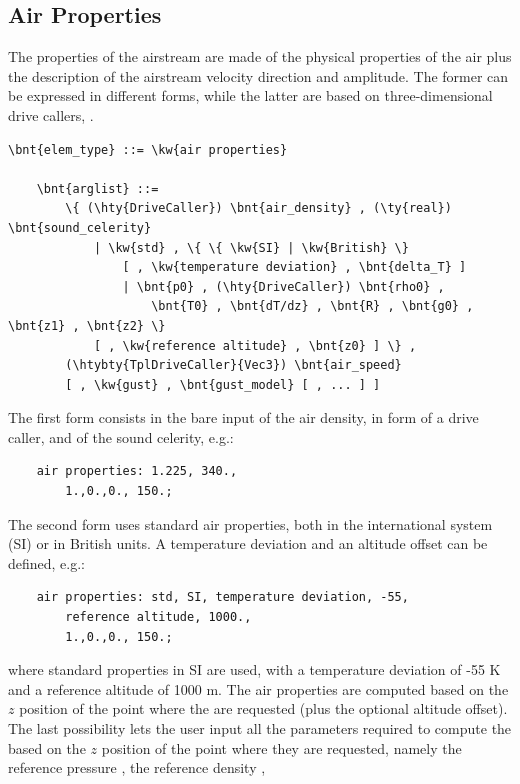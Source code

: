 \subsection{Air Properties}\label{sec:EL:AERO:AIRPROPERTIES}
The properties of the airstream are made of the physical properties
of the air plus the description of the airstream velocity direction
and amplitude.
The former can be expressed in different forms, while the latter
are based on three-dimensional drive callers, .
\begin{Verbatim}[commandchars=\\\{\}]
    \bnt{elem_type} ::= \kw{air properties}

    \bnt{arglist} ::=
        \{ (\hty{DriveCaller}) \bnt{air_density} , (\ty{real}) \bnt{sound_celerity}
            | \kw{std} , \{ \{ \kw{SI} | \kw{British} \}
                [ , \kw{temperature deviation} , \bnt{delta_T} ]
                | \bnt{p0} , (\hty{DriveCaller}) \bnt{rho0} ,
                    \bnt{T0} , \bnt{dT/dz} , \bnt{R} , \bnt{g0} , \bnt{z1} , \bnt{z2} \}
            [ , \kw{reference altitude} , \bnt{z0} ] \} ,
        (\htybty{TplDriveCaller}{Vec3}) \bnt{air_speed}
        [ , \kw{gust} , \bnt{gust_model} [ , ... ] ]
\end{Verbatim}
The first form consists in the bare input of the air density,
in form of a drive caller, and of the sound celerity, e.g.:
\begin{verbatim}
    air properties: 1.225, 340.,
        1.,0.,0., 150.;
\end{verbatim}
The second form uses standard air properties, both in the
international system (SI) or in British units.
A temperature deviation and an altitude offset can be defined, e.g.:
\begin{verbatim}
    air properties: std, SI, temperature deviation, -55,
        reference altitude, 1000.,
        1.,0.,0., 150.;
\end{verbatim}
where standard properties in SI are used, with a temperature
deviation of -55 K and a reference altitude of 1000 m.
The air properties are computed based on the $z$ position of the
point where the  are requested (plus the optional
altitude offset).
The last possibility lets the user input all the parameters
required to compute the  based on the $z$ position
of the point where they are requested, namely the reference
pressure , the reference density ,
